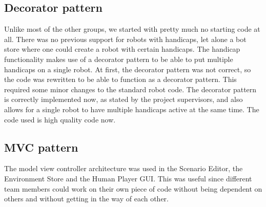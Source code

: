 \subsection*{Decorator pattern}
Unlike most of the other groups, we started with pretty much no starting code at all. There was no previous support for robots with handicaps, let alone a bot store where one could create a robot with certain handicaps. The handicap functionality makes use of a decorator pattern to be able to put multiple handicaps on a single robot. At first, the decorator pattern was not correct, so the code was rewritten to be able to function as a decorator pattern. This required some minor changes to the standard robot code. The decorator pattern is correctly implemented now, as stated by the project supervisors, and also allows for a single robot to have multiple handicaps active at the same time. The code used is high quality code now.

\subsection*{MVC pattern}
The model view controller architecture was used in the Scenario Editor, the Environment Store and the Human Player GUI. This was useful since different team members could work on their own piece of code without being dependent on others and without getting in the way of each other.
